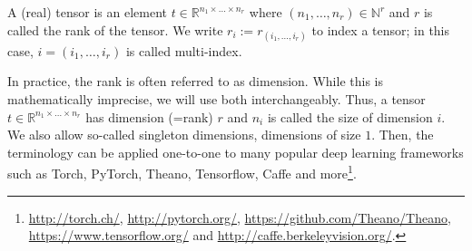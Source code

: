 \begin{definition}%
  A (real) tensor is an element $t \in \mathbb{R}^{n_1 \times \ldots \times n_r}$
  where $(n_1,\ldots,n_r) \in \mathbb{N}^r$ and $r$ is called the rank of the tensor.
  We write $r_i := r_{(i_1,\ldots,i_r)}$ to index a tensor; in this case,
  $i = (i_1, \ldots, i_r)$ is called multi-index.
\end{definition}

In practice, the rank is often referred to as dimension. While this is mathematically
imprecise, we will use both interchangeably. Thus, a tensor
$t \in \mathbb{R}^{n_1 \times \ldots \times n_r}$ has dimension (=rank) $r$ and
$n_i$ is called the size of dimension $i$. We also allow so-called singleton dimensions,
\ie dimensions of size $1$. Then, the terminology can be applied one-to-one
to many popular deep learning frameworks such as Torch, PyTorch, Theano,
Tensorflow, Caffe and more\footnote{
  \url{http://torch.ch/}, \url{http://pytorch.org/}, \url{https://github.com/Theano/Theano}, \url{https://www.tensorflow.org/} and \url{http://caffe.berkeleyvision.org/}.
}.

